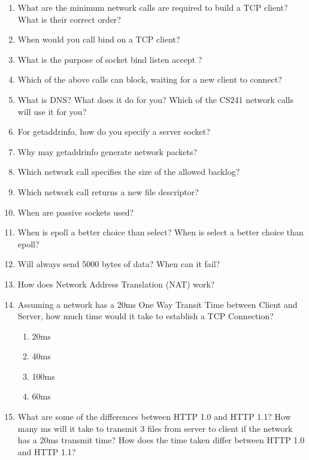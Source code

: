 \begin{enumerate}
\item What are the minimum network calls are required to build a TCP client? What is their correct order?

\item When would you call bind on a TCP client?

\item What is the purpose of socket bind listen accept ?

\item Which of the above calls can block, waiting for a new client to connect?

\item What is DNS? What does it do for you? Which of the CS241 network calls will use it for you?

\item For getaddrinfo, how do you specify a server socket?

\item Why may getaddrinfo generate network packets?

\item Which network call specifies the size of the allowed backlog?

\item Which network call returns a new file descriptor?

\item When are passive sockets used?

\item When is epoll a better choice than select? When is select a better choice than epoll?

\item Will  always send 5000 bytes of data? When can it fail?

\item How does Network Address Translation (NAT) work?

\item Assuming a network has a 20ms One Way Transit Time between Client and Server, how much time would it take to establish a TCP Connection?
  \begin{enumerate}
  \item 20ms
  \item 40ms
  \item 100ms
  \item 60ms
  \end{enumerate}

\item What are some of the differences between HTTP 1.0 and HTTP 1.1? How many ms will it take to transmit 3 files from server to client if the network has a 20ms transmit time? How does the time taken differ between HTTP 1.0 and HTTP 1.1?


\end{enumerate}
